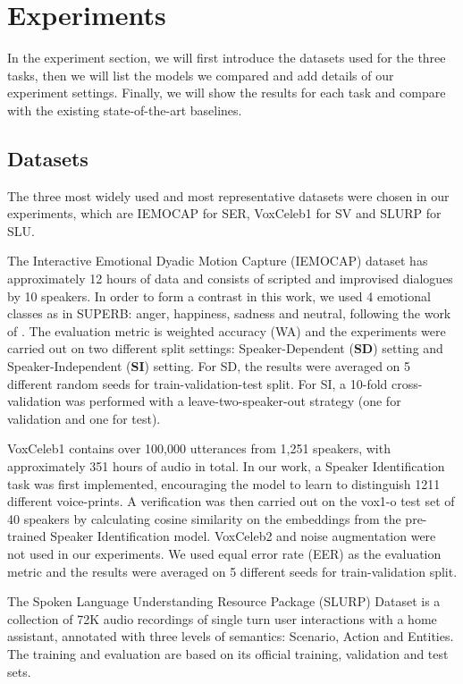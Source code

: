 \documentclass{article}
\begin{document}
\section{Experiments}

In the experiment section, we will first introduce the datasets used for the three tasks, then we will list the models we compared and add details of our experiment settings. Finally, we will show the results for each task and compare with the existing state-of-the-art baselines.

\subsection{Datasets}
The three most widely used and most representative datasets were chosen in our experiments, which are IEMOCAP for SER, VoxCeleb1 for SV and SLURP for SLU.

The Interactive Emotional Dyadic Motion Capture (IEMOCAP) dataset has approximately 12 hours of data and consists of scripted and improvised dialogues by 10 speakers. In order to form a contrast in this work, we used 4 emotional classes as in SUPERB: anger, happiness, sadness and neutral, following the work of \cite{IEMOCAP-relabel}. The evaluation metric is weighted accuracy (WA) and the experiments were carried out on two different split settings: Speaker-Dependent (\textbf{SD}) setting and Speaker-Independent (\textbf{SI}) setting. For SD, the results were averaged on 5 different random seeds for train-validation-test split. For SI, a 10-fold cross-validation was performed with a leave-two-speaker-out strategy (one for validation and one for test).





VoxCeleb1 contains over 100,000 utterances from 1,251 speakers, with approximately 351 hours of audio in total. In our work, a Speaker Identification task was first implemented, encouraging the model to learn to distinguish 1211 different voice-prints. A verification was then carried out on the vox1-o test set of 40 speakers by calculating cosine similarity on the embeddings from the pre-trained Speaker Identification model. VoxCeleb2 and noise augmentation were not used in our experiments. We used equal error rate (EER) as the evaluation metric and the results were averaged on 5 different seeds for train-validation split.




The Spoken Language Understanding Resource Package (SLURP) Dataset is a collection of 72K audio recordings of single turn user interactions with a home assistant, annotated with three levels of semantics: Scenario, Action and Entities. The training and evaluation are based on its official training, validation and test sets.
\end{document}
